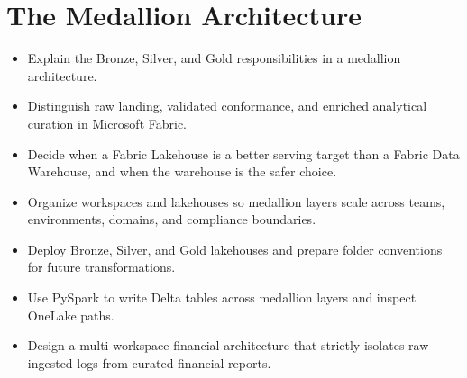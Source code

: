 \chapter{The Medallion Architecture}
%
%

\begin{objectives}
\begin{itemize}
    \item Explain the Bronze, Silver, and Gold responsibilities in a medallion architecture.
    \item Distinguish raw landing, validated conformance, and enriched analytical curation in Microsoft Fabric.
    \item Decide when a Fabric Lakehouse is a better serving target than a Fabric Data Warehouse, and when the warehouse is the safer choice.
    \item Organize workspaces and lakehouses so medallion layers scale across teams, environments, domains, and compliance boundaries.
    \item Deploy Bronze, Silver, and Gold lakehouses and prepare folder conventions for future transformations.
    \item Use PySpark to write Delta tables across medallion layers and inspect OneLake paths.
    \item Design a multi-workspace financial architecture that strictly isolates raw ingested logs from curated financial reports.
\end{itemize}
\end{objectives}

